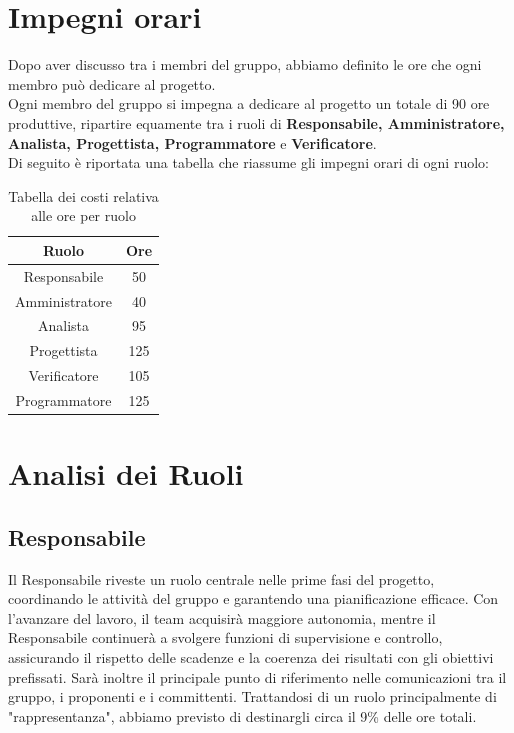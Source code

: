 \documentclass{article}
\begin{document}
	\section{Impegni orari}
	Dopo aver discusso tra i membri del gruppo, abbiamo definito le ore che ogni membro può dedicare al progetto.\\
	Ogni membro del gruppo si impegna a dedicare al progetto un totale di 90 ore produttive, ripartire equamente tra i ruoli di \textbf{Responsabile, Amministratore, Analista, Progettista, Programmatore }e \textbf{Verificatore}.\\
	Di seguito è riportata una tabella che riassume gli impegni orari di ogni ruolo:	
	
	\begin{table}[h!]
	\centering
	\begin{tabular}{|c|c|}
	\hline
	\rowcolor{gray!25}
	Ruolo & Ore \\ \hline
	Responsabile & 50  \\ \hline
	Amministratore & 40 \\ \hline
	Analista & 95  \\ \hline
	Progettista & 125 \\ \hline
	Verificatore & 105 \\ \hline
	Programmatore & 125 \\ \hline
	\end{tabular}
	\caption{Tabella dei costi relativa alle ore per ruolo}
	\end{table}

	

	\section{Analisi dei Ruoli}
		\subsection{Responsabile}
		Il Responsabile riveste un ruolo centrale nelle prime fasi del progetto, coordinando le attività del gruppo e garantendo una pianificazione efficace. Con l’avanzare del lavoro, il team acquisirà maggiore autonomia, mentre il Responsabile continuerà a svolgere funzioni di supervisione e controllo, assicurando il rispetto delle scadenze e la coerenza dei risultati con gli obiettivi prefissati.
		Sarà inoltre il principale punto di riferimento nelle comunicazioni tra il gruppo, i proponenti e i committenti.
		Trattandosi di un ruolo principalmente di "rappresentanza", abbiamo previsto di destinargli circa il 9\% delle ore totali.
\end{document}
